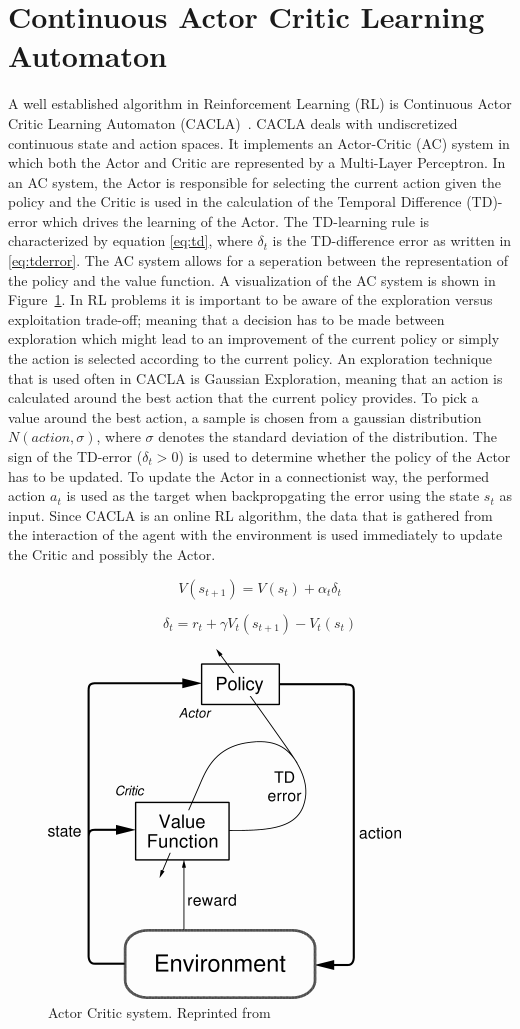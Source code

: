 
\section{Continuous Actor Critic Learning Automaton}
A well established algorithm in Reinforcement Learning (RL) is Continuous Actor Critic Learning Automaton (CACLA)~\cite{van2007reinforcement}. CACLA deals with undiscretized continuous state and action spaces. It implements an Actor-Critic (AC) system in which both the Actor and Critic are represented by a Multi-Layer Perceptron. In an AC system, the Actor is responsible for selecting the current action given the policy and the Critic is used in the calculation of the Temporal Difference (TD)-error which drives the learning of the Actor. The TD-learning rule is characterized by equation \eqref{eq:td}, where $\delta_{t}$ is the TD-difference error as written in \eqref{eq:tderror}. The AC system allows for a seperation between the representation of the policy and the value function. A visualization of the AC system is shown in Figure~\ref{fig:actorcriticsystem}. In RL problems it is important to be aware of the exploration versus exploitation trade-off; meaning that a decision has to be made between exploration which might lead to an improvement of the current policy or simply the action is selected according to the current policy. An exploration technique that is used often in CACLA is Gaussian Exploration, meaning that an action is calculated around the best action that the current policy provides. To pick a value around the best action, a sample is chosen from a gaussian distribution $N(action, \sigma)$, where $\sigma$ denotes the standard deviation of the distribution. The sign of the TD-error ($\delta_{t} > 0$) is used to determine whether the policy of the Actor has to be updated. To update the Actor in a connectionist way, the performed action $a_{t}$ is used as the target when backpropgating the error using the state $s_{t}$ as input. Since CACLA is an online RL algorithm, the data that is gathered from the interaction of the agent with the environment is used immediately to update the Critic and possibly the Actor. 

\begin{equation}
\label{eq:td}
V(s_{t+1}) = V(s_t) + \alpha_{t} \delta_{t}
\end{equation}

\begin{equation}
\label{eq:tderror}
\delta_{t} = r_{t} + \gamma V_{t}(s_{t+1}) - V_{t}(s_{t})
\end{equation}

\begin{figure}[t]
 \centering 
    \includegraphics[width = 0.35\columnwidth]{figs/actorcritic.png}
 \caption{Actor Critic system. Reprinted from~\cite{sutton1998reinforcement}}
\label{fig:actorcriticsystem}
\end{figure}



